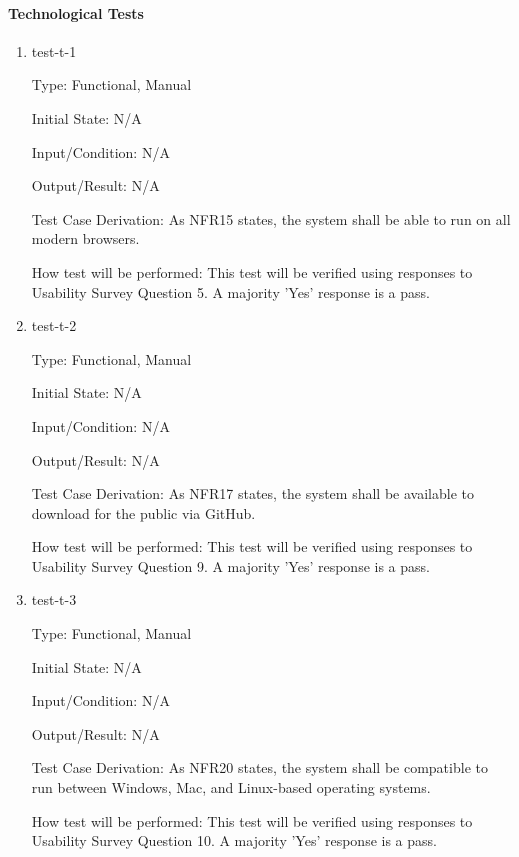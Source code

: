 \documentclass[12pt, titlepage]{article}
\begin{document}
\paragraph{Technological Tests}

\begin{enumerate}

\item{test-t-1\\}

Type: Functional, Manual		

Initial State: N/A	

Input/Condition: N/A		

Output/Result: N/A

Test Case Derivation: As NFR15 states, the system shall be able to run on all modern browsers.

How test will be performed: This test will be verified using responses to Usability Survey Question 5. A majority 'Yes' response is a pass.

\item{test-t-2\\}

Type: Functional, Manual

Initial State: N/A

Input/Condition: N/A

Output/Result: N/A

Test Case Derivation: As NFR17 states, the system shall be available to download for the public via GitHub.		

How test will be performed: This test will be verified using responses to Usability Survey Question 9. A majority 'Yes' response is a pass.

\item{test-t-3\\}

Type: Functional, Manual

Initial State: N/A

Input/Condition: N/A		

Output/Result: N/A

Test Case Derivation: As NFR20 states, the system shall be compatible to run between Windows, Mac, and Linux-based operating systems.		

How test will be performed: This test will be verified using responses to Usability Survey Question 10. A majority 'Yes' response is a pass.

\end{enumerate}
\end{document}
